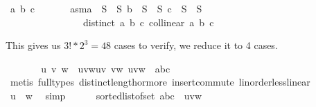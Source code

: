 \begin{isabellebody}
\ a\ b\ c\isanewline
\ \ \ \ \isamarkupfalse%
\ \ asm{\isacharcolon}{\kern0pt}{\isachardoublequoteopen}a\ {\isasymin}\ S{}\ {\isasymunion}\ S{}{\isachardoublequoteclose}\ {\isachardoublequoteopen}b\ {\isasymin}\ S{}\ {\isasymunion}\ S{}{\isachardoublequoteclose}\ {\isachardoublequoteopen}c\ {\isasymin}\ S{}\ {\isasymunion}\ S{}{\isachardoublequoteclose}\ \isanewline
\ \ \ \ \ \ \ \ \ \ \ \ \ \ \ \ {\isachardoublequoteopen}distinct\ {\isacharbrackleft}{\kern0pt}a{\isacharcomma}{\kern0pt}\ b{\isacharcomma}{\kern0pt}\ c{\isacharbrackright}{\kern0pt}{\isachardoublequoteclose}\ {\isachardoublequoteopen}collinear{}\ a\ b\ c{\isachardoublequoteclose}%
\begin{isamarkuptext}%
This gives us $3!*2^3 = 48$ cases to verify, we reduce it to 4 cases.%
\end{isamarkuptext}\isamarkuptrue%
\ \ \ \ \isamarkupfalse%
\ \isamarkupfalse%
\ u\ v\ w\ \ uvw{\isacharcolon}{\kern0pt}{\isachardoublequoteopen}u{\isacharless}{\kern0pt}v{\isachardoublequoteclose}\ {\isachardoublequoteopen}v{\isacharless}{\kern0pt}w{\isachardoublequoteclose}\ {\isachardoublequoteopen}{\isacharbraceleft}{\kern0pt}u{\isacharcomma}{\kern0pt}v{\isacharcomma}{\kern0pt}w{\isacharbraceright}{\kern0pt}\ {\isacharequal}{\kern0pt}\ {\isacharbraceleft}{\kern0pt}a{\isacharcomma}{\kern0pt}b{\isacharcomma}{\kern0pt}c{\isacharbraceright}{\kern0pt}{\isachardoublequoteclose}\isanewline
\ \ \ \ \ \ \isamarkupfalse%
\ {\isacharparenleft}{\kern0pt}metis\ {\isacharparenleft}{\kern0pt}full{\isacharunderscore}{\kern0pt}types{\isacharparenright}{\kern0pt}\ distinct{\isacharunderscore}{\kern0pt}length{\isacharunderscore}{\kern0pt}{}{\isacharunderscore}{\kern0pt}or{\isacharunderscore}{\kern0pt}more\ insert{\isacharunderscore}{\kern0pt}commute\ linorder{\isacharunderscore}{\kern0pt}less{\isacharunderscore}{\kern0pt}linear{\isacharparenright}{\kern0pt}\isanewline
\ \ \ \ \isamarkupfalse%
\ {}{\isacharcolon}{\kern0pt}{\isachardoublequoteopen}u\ {\isacharless}{\kern0pt}\ w{\isachardoublequoteclose}\ \isamarkupfalse%
\ simp\isanewline
\ \ \ \ \isamarkupfalse%
\ {}{\isacharcolon}{\kern0pt}{\isachardoublequoteopen}sorted{\isacharunderscore}{\kern0pt}list{\isacharunderscore}{\kern0pt}of{\isacharunderscore}{\kern0pt}set\ {\isacharbraceleft}{\kern0pt}a{\isacharcomma}{\kern0pt}b{\isacharcomma}{\kern0pt}c{\isacharbraceright}{\kern0pt}\ {\isacharequal}{\kern0pt}\ {\isacharbrackleft}{\kern0pt}u{\isacharcomma}{\kern0pt}v{\isacharcomma}{\kern0pt}w{\isacharbrackright}{\kern0pt}{\isachardoublequoteclose}\ \isamarkupfalse%

\end{isabellebody}
